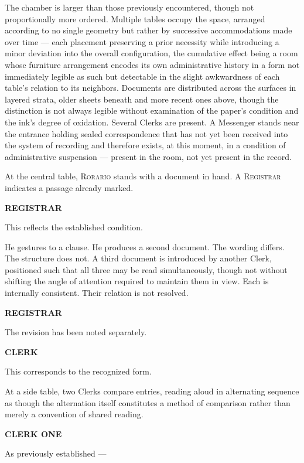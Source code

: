 \documentclass[12pt, oneside]{article}
\newenvironment{action}{%
  \vspace{0.6em}%
  \noindent\ignorespaces%
}{%
  \par\vspace{0.6em}%
}
\newcommand{\character}[1]{%
  \vspace{0.8em}%
  \begin{center}%
    \bfseries\MakeUppercase{#1}%
  \end{center}%
  \vspace{-0.3em}%
}
\newenvironment{dialogue}{%
  \vspace{0.2em}%
  \begin{list}{}{%
    \setlength{\leftmargin}{1.2in}%
    \setlength{\rightmargin}{0.8in}%
    \setlength{\itemsep}{0.6em}%
    \setlength{\parsep}{0pt}%
  }%
}{%
  \end{list}%
  \vspace{0.4em}%
}
\newcommand{\says}[2]{%
  \character{#1}%
  \begin{dialogue}\item #2\end{dialogue}%
}
\begin{document}
\begin{action}
The chamber is larger than those previously encountered, though not proportionally more ordered. Multiple tables occupy the space, arranged according to no single geometry but rather by successive accommodations made over time --- each placement preserving a prior necessity while introducing a minor deviation into the overall configuration, the cumulative effect being a room whose furniture arrangement encodes its own administrative history in a form not immediately legible as such but detectable in the slight awkwardness of each table's relation to its neighbors. Documents are distributed across the surfaces in layered strata, older sheets beneath and more recent ones above, though the distinction is not always legible without examination of the paper's condition and the ink's degree of oxidation. Several Clerks are present. A Messenger stands near the entrance holding sealed correspondence that has not yet been received into the system of recording and therefore exists, at this moment, in a condition of administrative suspension --- present in the room, not yet present in the record.

At the central table, \textsc{Rorario} stands with a document in hand. A \textsc{Registrar} indicates a passage already marked.
\end{action}

\says{Registrar}{This reflects the established condition.}

\begin{action}
He gestures to a clause. He produces a second document. The wording differs. The structure does not. A third document is introduced by another Clerk, positioned such that all three may be read simultaneously, though not without shifting the angle of attention required to maintain them in view. Each is internally consistent. Their relation is not resolved.
\end{action}

\says{Registrar}{The revision has been noted separately.}

\says{Clerk}{This corresponds to the recognized form.}

\begin{action}
At a side table, two Clerks compare entries, reading aloud in alternating sequence as though the alternation itself constitutes a method of comparison rather than merely a convention of shared reading.
\end{action}

\says{Clerk One}{As previously established ---}
\end{document}
